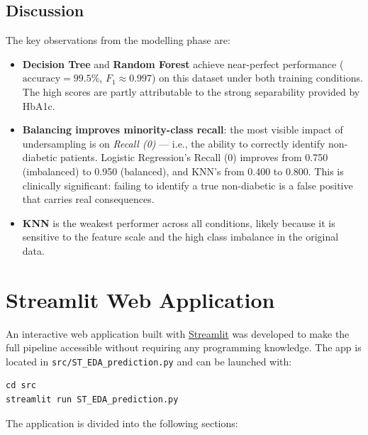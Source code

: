 \documentclass[12pt, a4paper]{article}
\begin{document}
\subsection{Discussion}

The key observations from the modelling phase are:

\begin{itemize}
    \item \textbf{Decision Tree} and \textbf{Random Forest} achieve near-perfect
          performance ($\text{accuracy} = 99.5\%$, $F_1 \approx 0.997$) on this
          dataset under both training conditions. The high scores are partly
          attributable to the strong separability provided by HbA1c.
    \item \textbf{Balancing improves minority-class recall}: the most visible
          impact of undersampling is on \textit{Recall (0)} --- i.e., the
          ability to correctly identify non-diabetic patients. Logistic
          Regression's Recall (0) improves from 0.750 (imbalanced) to 0.950
          (balanced), and KNN's from 0.400 to 0.800. This is clinically
          significant: failing to identify a true non-diabetic is a
          false positive that carries real consequences.
    \item \textbf{KNN} is the weakest performer across all conditions, likely
          because it is sensitive to the feature scale and the high class
          imbalance in the original data.
\end{itemize}

\section{Streamlit Web Application}

An interactive web application built with
\href{https://streamlit.io}{Streamlit} was developed to make the full pipeline
accessible without requiring any programming knowledge. The app is located in
\texttt{src/ST\_EDA\_prediction.py} and can be launched with:

\begin{lstlisting}
cd src
streamlit run ST_EDA_prediction.py
\end{lstlisting}

The application is divided into the following sections:
\end{document}
